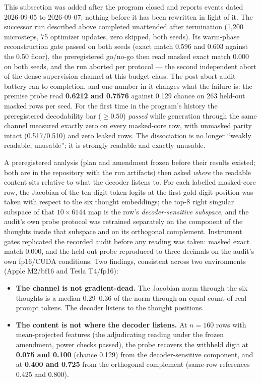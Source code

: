 \documentclass[10pt,a4paper]{article}
\begin{document}
This subsection was added after the program closed and reports events dated
2026-09-05 to 2026-09-07; nothing before it has been rewritten in light of it.
The successor run described above completed unattended after termination
(1{,}200 microsteps, 75 optimizer updates, zero skipped, both seeds). Its
warm-phase reconstruction gate passed on both seeds (exact match 0.596 and
0.603 against the 0.50 floor), the preregistered go/no-go then read masked
exact match 0.000 on both seeds, and the run aborted per protocol --- the
second independent abort of the dense-supervision channel at this budget
class. The post-abort audit battery ran to completion, and one number in it
changes what the failure is: the premise probe read \textbf{0.6212 and
0.7576} against 0.129 chance on 263 held-out masked rows per seed. For the
first time in the program's history the preregistered decodability bar
($\geq 0.50$) \emph{passed} while generation through the same channel
measured exactly zero on every masked-core row, with unmasked parity intact
(0.517/0.510) and zero leaked rows. The dissociation is no longer ``weakly
readable, unusable''; it is strongly readable and exactly unusable.

A preregistered analysis (plan and amendment frozen before their results
existed; both are in the repository with the run artifacts) then asked
\emph{where} the readable content sits relative to what the decoder listens
to. For each labelled masked-core row, the Jacobian of the ten digit-token
logits at the first gold-digit position was taken with respect to the six
thought embeddings; the top-8 right singular subspace of that $10 \times
6144$ map is the row's \emph{decoder-sensitive subspace}, and the audit's own
probe protocol was retrained separately on the component of the thoughts
inside that subspace and on its orthogonal complement. Instrument gates
replicated the recorded audit before any reading was taken: masked exact
match 0.000, and the held-out probe reproduced to three decimals on the
audit's own fp16/CUDA conditions. Two findings, consistent across two
environments (Apple M2/bf16 and Tesla T4/fp16):

\begin{itemize}
\item \textbf{The channel is not gradient-dead.} The Jacobian norm through
  the six thoughts is a median 0.29--0.36 of the norm through an equal count
  of real prompt tokens. The decoder listens to the thought positions.
\item \textbf{The content is not where the decoder listens.} At $n{=}160$
  rows with mean-projected features (the adjudicating reading under the
  frozen amendment, power checks passed), the probe recovers the withheld
  digit at \textbf{0.075 and 0.100} (chance 0.129) from the
  decoder-sensitive component, and at \textbf{0.400 and 0.725} from the
  orthogonal complement (same-row references 0.425 and 0.800).
\end{itemize}
\end{document}
